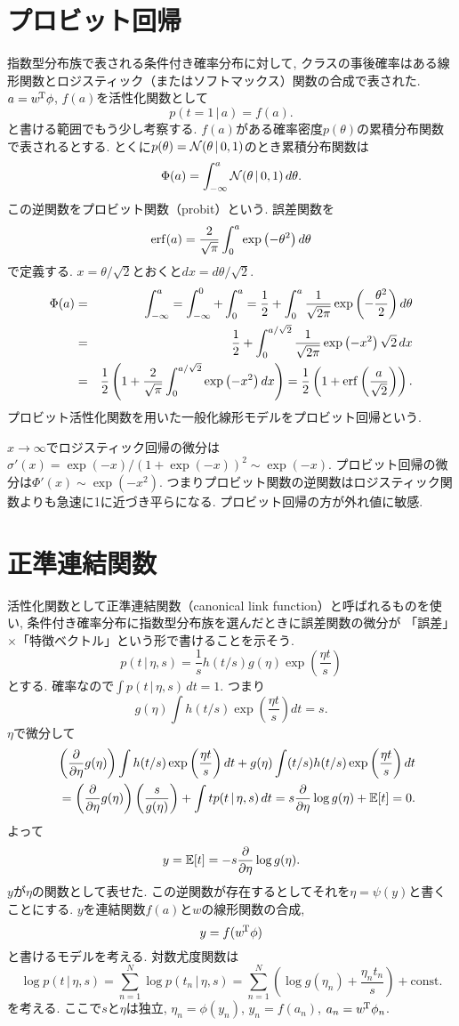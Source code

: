 \section{プロビット回帰}
指数型分布族で表される条件付き確率分布に対して, クラスの事後確率はある線形関数とロジスティック（またはソフトマックス）関数の合成で表された.
$a={w}^{\!\mathrm{T}}\phi$, $f(a)$を活性化関数として
$$
p(t=1\,|\,a)=f(a).
$$
と書ける範囲でもう少し考察する. $f(a)$がある確率密度$p(\theta)$の累積分布関数で表されるとする.
とくに$p(\theta)={\cal N}(\theta\,|\,0,1)$のとき累積分布関数は
$$
\Phi(a)=\int_{-\infty}^a {\cal N}(\theta\,|\,0,1)\,d\theta.
$$
この逆関数をプロビット関数（probit）という. 誤差関数を
$$
\mathop{\mathrm{erf}}\nolimits(a)=\frac{2}{\sqrt{\pi}}\int_0^a \exp\left(-\theta^2\right) d\theta
$$
で定義する.
$x=\theta/\sqrt{2}$とおくと$dx=d\theta/\sqrt{2}$.
\begin{eqnarray*}
\Phi(a)
 &=& \int_{-\infty}^a = \int_{-\infty}^0 + \int_0^a=\frac{1}{2}+\int_0^a \frac{1}{\sqrt{2\pi}}\exp\left(-\frac{\theta^2}{2}\right) d\theta\\
 &=&\frac{1}{2}+\int_0^{a/\sqrt{2}}\frac{1}{\sqrt{2\pi}}\exp\left(-x^2\right)\sqrt{2}\,dx\\
 &=&\frac{1}{2}\left(1+\frac{2}{\sqrt{\pi}}\int_0^{a/\sqrt{2}} \exp\left(-x^2\right) dx\right)
 =\frac{1}{2}\left(1+\mathop{\mathrm{erf}}\nolimits\left(\frac{a}{\sqrt{2}}\right)\right).
\end{eqnarray*}
プロビット活性化関数を用いた一般化線形モデルをプロビット回帰という.

$x\rightarrow\infty$でロジスティック回帰の微分は$\sigma'(x)=\exp(-x)/(1+\exp(-x))^2 \sim \exp(-x)$.
プロビット回帰の微分は$\Phi'(x) \sim \exp(-x^2)$. つまりプロビット関数の逆関数はロジスティック関数よりも急速に1に近づき平らになる. プロビット回帰の方が外れ値に敏感.

\section{正準連結関数}
活性化関数として正準連結関数（canonical link function）と呼ばれるものを使い, 条件付き確率分布に指数型分布族を選んだときに誤差関数の微分が
「誤差」$\times$「特徴ベクトル」という形で書けることを示そう.
$$
p(t\,|\,\eta,s)=\frac{1}{s}h(t/s)g(\eta)\exp\left(\frac{\eta t}{s}\right)
$$
とする. 確率なので$\int p(t\,|\,\eta,s)\,dt=1$.
つまり
$$
g(\eta)\int h(t/s) \exp\left(\frac{\eta t}{s}\right) dt=s.
$$
$\eta$で微分して
\begin{eqnarray*}
&& \left(\frac{\partial}{\partial \eta}g(\eta)\right) \int h(t/s)\exp\left(\frac{\eta t}{s}\right) dt+g(\eta)\int (t/s) h(t/s) \exp\left(\frac{\eta t}{s}\right) dt\\
&&= \left(\frac{\partial}{\partial \eta}g(\eta)\right)\left(\frac{s}{g(\eta)}\right)+\int t p(t\,|\,\eta,s)\,dt
= s\frac{\partial}{\partial \eta}\log g(\eta) + \mathbb{E}[t] = 0.
\end{eqnarray*}
よって
$$
y=\mathbb{E}[t]=-s\frac{\partial}{\partial \eta} \log g(\eta).
$$
$y$が$\eta$の関数として表せた.
この逆関数が存在するとしてそれを$\eta=\psi(y)$と書くことにする.
$y$を連結関数$f(a)$と$w$の線形関数の合成,
$$
y=f({w}^{\!\mathrm{T}}\phi)
$$
と書けるモデルを考える. 対数尤度関数は
$$
\log p(t\,|\,\eta,s)=\sum_{n=1}^N \log p(t_n\,|\,\eta,s)=\sum_{n=1}^N \left(\log g(\eta_n) + \frac{\eta_n t_n}{s}\right) + \text{const.}
$$
を考える. ここで$s$と$\eta$は独立, $\eta_n=\phi(y_n)$, $y_n=f(a_n)$, $a_n={w}^{\!\mathrm{T}}\phi_n$.

